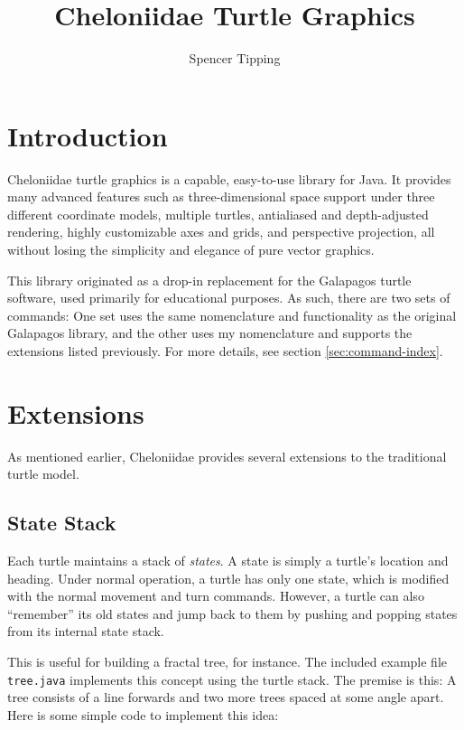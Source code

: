 \documentclass{article}
\begin{document}
  \title{Cheloniidae Turtle Graphics}
  \author{Spencer Tipping}
  \date{}
  \maketitle

  \tableofcontents

  \section{Introduction}
    \label{sec:introduction}

    Cheloniidae turtle graphics is a capable, easy-to-use library for Java. It
    provides many advanced features such as three-dimensional space support
    under three different coordinate models, multiple turtles, antialiased and
    depth-adjusted rendering, highly customizable axes and grids, and
    perspective projection, all without losing the simplicity and elegance of
    pure vector graphics.

    This library originated as a drop-in replacement for the Galapagos turtle
    software, used primarily for educational purposes. As such, there are two
    sets of commands: One set uses the same nomenclature and functionality as
    the original Galapagos library, and the other uses my nomenclature and
    supports the extensions listed previously. For more details, see section
    \ref{sec:command-index}.

  \section{Extensions}
    \label{sec:extensions}

    As mentioned earlier, Cheloniidae provides several extensions to the
    traditional turtle model.

    \subsection{State Stack}
      \label{sec:state-stack}

      Each turtle maintains a stack of {\em states}. A state is simply a
      turtle's location and heading. Under normal operation, a turtle has only
      one state, which is modified with the normal movement and turn commands.
      However, a turtle can also ``remember'' its old states and jump back to
      them by pushing and popping states from its internal state stack.

      This is useful for building a fractal tree, for instance. The included
      example file \verb|tree.java| implements this concept using the turtle
      stack. The premise is this: A tree consists of a line forwards and two
      more trees spaced at some angle apart. Here is some simple code to
      implement this idea:
\end{document}
